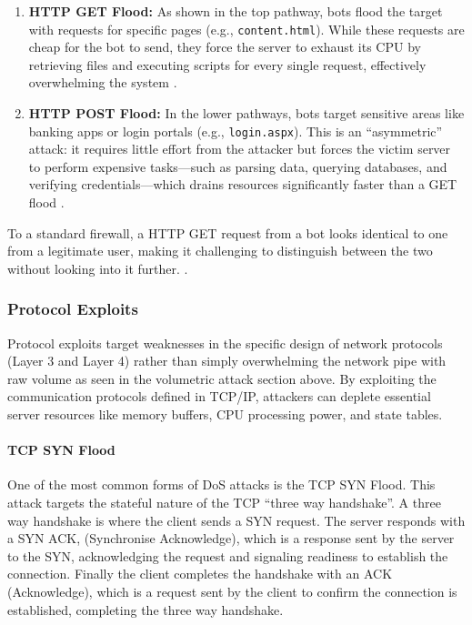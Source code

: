 \begin{enumerate}
    \item \textbf{HTTP GET Flood:} As shown in the top pathway, bots flood the target with requests for specific pages (e.g., \texttt{content.html}). While these requests are cheap for the bot to send, they force the server to exhaust its CPU by retrieving files and executing scripts for every single request, effectively overwhelming the system \cite{singh_application_2017}.

    \item \textbf{HTTP POST Flood:} In the lower pathways, bots target sensitive areas like banking apps or login portals (e.g., \texttt{login.aspx}). This is an ``asymmetric'' attack: it requires little effort from the attacker but forces the victim server to perform expensive tasks—such as parsing data, querying databases, and verifying credentials—which drains resources significantly faster than a GET flood \cite{sreeram_http_2019}.
\end{enumerate}

To a standard firewall, a HTTP GET request from a bot looks identical to one from a legitimate user,
making it challenging to distinguish between the two without looking into it further. \cite{sreeram_http_2019}
\cite{hirsi_comprehensive_2025}.


\subsubsection{Protocol Exploits}
Protocol exploits target weaknesses in the specific design of network protocols
(Layer 3 and Layer 4) rather than simply overwhelming the network pipe with raw
volume as seen in the volumetric attack section above. By exploiting the
communication protocols defined in TCP/IP, attackers can deplete essential
server resources like memory buffers, CPU processing power, and state tables.

\paragraph{TCP SYN Flood}
\par
One of the most common forms of DoS attacks is the TCP SYN Flood. This attack targets
the stateful nature of the TCP ``three way handshake''. A three way handshake is where the client sends a SYN request. The server responds with a SYN ACK, (Synchronise Acknowledge), which is a response sent by the server to the SYN, acknowledging the request and signaling readiness to establish the connection. Finally the client completes the handshake with an ACK (Acknowledge), which is a request sent by the client to confirm the connection is established, completing the three way handshake.


